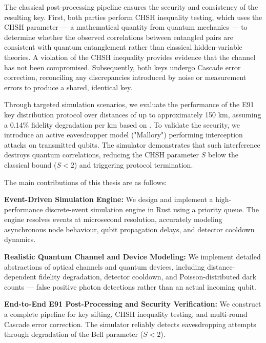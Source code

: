 The classical post-processing pipeline ensures the security and consistency of the resulting key. First, both parties perform CHSH inequality testing, which uses the CHSH parameter — a mathematical quantity from quantum mechanics — to determine whether the observed correlations between entangled pairs are consistent with quantum entanglement rather than classical hidden-variable theories. A violation of the CHSH inequality provides evidence that the channel has not been compromised. Subsequently, both keys undergo Cascade error correction, reconciling any discrepancies introduced by noise or measurement errors to produce a shared, identical key.

Through targeted simulation scenarios, we evaluate the performance of the E91 key distribution protocol over distances of up to approximately 150 km, assuming a 0.14\% fidelity degradation per km based on \cite{sena2025entanglement}. To validate the security, we introduce an active eavesdropper model ("Mallory") performing interception attacks on transmitted qubits. The simulator demonstrates that such interference destroys quantum correlations, reducing the CHSH parameter $S$ below the classical bound ($S < 2$) and triggering protocol termination.



The main contributions of this thesis are as follows:

\textbf{Event-Driven Simulation Engine:}
We design and implement a high-performance discrete-event simulation engine in Rust using a priority queue. The engine resolves events at microsecond resolution, accurately modeling asynchronous node behaviour, qubit propagation delays, and detector cooldown dynamics.

\textbf{Realistic Quantum Channel and Device Modeling:}
We implement detailed abstractions of optical channels and quantum devices, including  distance-dependent fidelity degradation, detector cooldown, and Poisson-distributed dark  counts — false positive photon detections rather than an actual incoming qubit.

\textbf{End-to-End E91 Post-Processing and Security Verification:}
We construct a complete pipeline for key sifting, CHSH inequality testing, and multi-round Cascade error correction. The simulator reliably detects eavesdropping attempts through degradation of the Bell parameter ($S < 2$).

